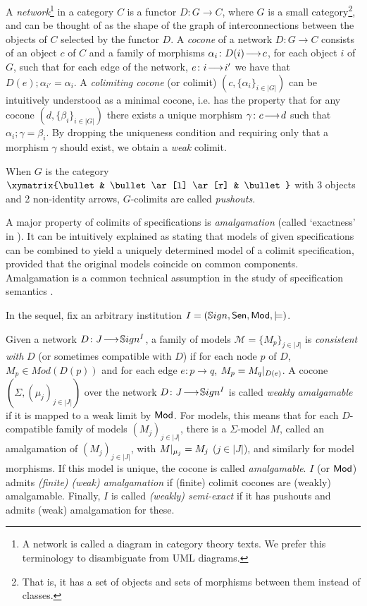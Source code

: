\documentclass[10pt,fleqn,%
\ifpretendfinal
final%
\else
draft%
\fi,
]{scrreprt}
\begin{document}
A \emph{network}\footnote{A network is called a diagram in category theory texts. We prefer this terminology to disambiguate 
from UML diagrams.} in a category $C$ is 
a functor $D:G\to C$, where $G$ is a small category\footnote{That is, it has a set of objects and sets of morphisms between them
instead of classes.}, and can be thought of as the shape of the graph of
interconnections between the objects of $C$ selected by the functor $D$. A \emph{cocone} of
a network $D:G\to C$ consists of an object $c$ of $C$ and a family of
morphisms $\alpha_i\colon D(i)\!\longrightarrow\!c$, for each object $i$ of $G$, such that for
each edge of the network, $e\colon i\!\longrightarrow\!i'$ we have that 
$D(e);\alpha_{i'} = \alpha_{i}$. 
A \emph{colimiting cocone} (or colimit) $(c, \{\alpha_i\}_{i\in|G|})$ can be
intuitively understood as a minimal cocone, i.e. has the property that for any 
cocone $(d, \{\beta_i\}_{i\in |G|})$ there exists a unique morphism 
$\gamma\colon c\!\longrightarrow\!d$ such that $\alpha_i;\gamma = \beta_i$. By dropping the 
uniqueness condition and requiring only that a morphism $\gamma$ should exist,
we obtain a \emph{weak} colimit. 

When $G$ is the category $\xymatrix{\bullet & \bullet \ar[l] \ar[r]
& \bullet }$ with 3 objects and 2 non-identity arrows, $G$-colimits are
called  \emph{pushouts}.  

A major property of colimits of specifications is \emph{amalgamation} (called `exactness' in \cite{DGS91}). It can be intuitively explained as 
stating that models of given
specifications can be combined to yield a uniquely determined model of
a colimit specification, provided that the original models coincide on
common components. Amalgamation is a common technical assumption in the 
study of specification semantics
\cite{STbook}.

In the sequel, fix an arbitrary institution
$I=(\mathbb{S}ign,\mathsf{Sen},\mathsf{Mod},\models)$.  

\begin{definition}
Given a network $D\colon J\!\longrightarrow\!\mathbb{S}ign^I$, 
a family of models $\mathcal{M} = \{M_p\}_{j\in |J|}$ is
\emph{consistent with} $D$ (or sometimes compatible with $D$) 
if for each node $p$ of $D$, $M_p \in Mod(D(p))$ and
for each edge $e:p\rightarrow q$, $M_p = M_q|_{D(e)}$.
  A cocone
$(\Sigma,(\mu_j)_{j\in|J|})$ over the network $D\colon J\!\longrightarrow\!\mathbb{S}ign^I$ is
called \emph{weakly amalgamable} if it is mapped to a weak limit by $\mathsf{Mod}$.
For models, this means that for each $D$-compatible family of
models $(M_j)_{j\in|J|}$, there is a $\Sigma$-model $M$, called an amalgamation of 
 $(M_j)_{j\in|J|}$,
with
$M|_{\mu_j}=M_j$ ($j\in|J|$), and similarly for model morphisms.
 If this model is unique, the cocone
is called \emph{amalgamable}. 
$I$ (or $\mathsf{Mod}$) admits \emph{(finite) (weak)
amalgamation} if (finite) colimit cocones are (weakly) amalgamable.
Finally, $I$ is called \emph{(weakly) semi-exact} if 
it has pushouts and admits (weak) amalgamation for these.
\end{definition}
\end{document}
